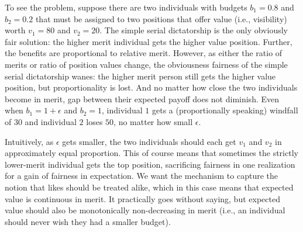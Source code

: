 To see the problem, suppose there are two individuals with budgets
$b_1 = 0.8$ and $b_2 = 0.2$ that must be assigned to two positions
that offer value (i.e., visibility) worth $v_1 = 80$ and $v_2 =
20$. The simple serial dictatorship is the only obviously fair
solution: the higher merit individual gets the higher value
position. Further, the benefits are proportional to relative
merit. However, as either the ratio of merits or ratio of position
values change, the obviousness fairness of the simple serial
dictatorship wanes: the higher merit person still gets the higher
value position, but proportionality is lost. And no matter how close
the two individuals become in merit, gap between their expected payoff
does not diminish. Even when $b_1 = 1 + \epsilon$ and $b_2 = 1$,
individual $1$ gets a (proportionally speaking) windfall of $30$ and
individual $2$ loses $50$, no matter how small $\epsilon$.

Intuitively, as $\epsilon$ gets smaller, the two individuals should
each get $v_1$ and $v_2$ in approximately equal proportion. This of
course means that sometimes the strictly lower-merit individual gets
the top position, sacrificing fairness in one realization for a gain
of fairness in expectation. We want the mechanism to capture the
notion that likes should be treated alike, which in this case means
that expected value is continuous in merit. It practically goes
without saying, but expected value should also be monotonically
non-decreasing in merit (i.e., an individual should never wish they
had a smaller budget).



